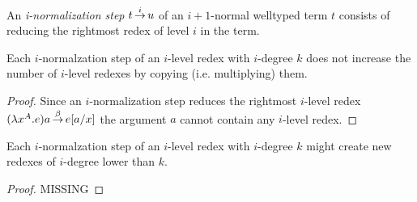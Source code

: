 \begin{definition}
    An \emph{i-normalization step} $t {\,\stackrel{i}{\to}\,} u$
    of an $i+1$-normal welltyped
    term $t$ consists of reducing the rightmost redex of level $i$ in the term.
\end{definition}



\begin{theorem}
    Each $i$-normalzation step of an $i$-level redex with $i$-degree $k$ does
    not increase the number of $i$-level redexes by copying (i.e. multiplying)
    them.
    \label{thm:INormalizationNotCopy}

    \begin{proof}
        Since an $i$-normalization step reduces the rightmost $i$-level redex
        $(\lambda x^A.e)a {\,\stackrel{\beta}{\to}\,} e[a/x]$ the argument $a$ cannot contain any
        $i$-level redex.
    \end{proof}
\end{theorem}



\begin{theorem}
    Each $i$-normalzation step of an $i$-level redex with $i$-degree $k$ might
    create new redexes of $i$-degree lower than $k$.
    \label{thm:INormalizationDecreasesDegree}

    \begin{proof}
        MISSING
    \end{proof}
\end{theorem}












